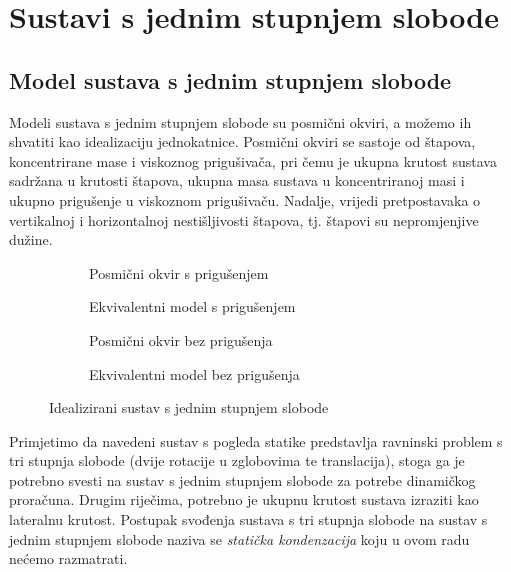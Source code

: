 \section{Sustavi s jednim stupnjem slobode}
\subsection{Model sustava s jednim stupnjem slobode}
Modeli sustava s jednim stupnjem slobode su posmični okviri, a možemo ih shvatiti
kao idealizaciju jednokatnice. Posmični okviri se sastoje od štapova, koncentrirane
mase i viskoznog prigušivača, pri čemu je ukupna krutost sustava sadržana u krutosti
štapova, ukupna masa sustava u koncentriranoj masi i ukupno prigušenje u viskoznom
prigušivaču. Nadalje, vrijedi pretpostavaka o vertikalnoj i horizontalnoj
nestišljivosti štapova, tj. štapovi su nepromjenjive dužine.
\par
\begin{figure}[H]
    \begin{subfigure}[b]{0.5\textwidth}\label{fig:priguseni-sustav-sdf}
        \centering
        
        \caption{Posmični okvir s prigušenjem}
    \end{subfigure}
    \hfill
    \begin{subfigure}[b]{0.5\textwidth}\label{fig:priguseni-ekvivalentni-sustav-sdf}
        \centering
        
        \caption{Ekvivalentni model s prigušenjem}
    \end{subfigure}
    \vfill
    \begin{subfigure}[b]{0.5\textwidth}\label{fig:nepriguseni-sustav-sdf}
        \centering
        
        \caption{Posmični okvir bez prigušenja}
    \end{subfigure}
    \hfill
    \begin{subfigure}[b]{0.5\textwidth}\label{fig:nepriguseni-ekvivalentni-sustav-sdf}
        \centering
        
        \caption{Ekvivalentni model bez prigušenja}
    \end{subfigure}
    \caption{Idealizirani sustav s jednim stupnjem slobode}
\end{figure}

Primjetimo da navedeni sustav s pogleda statike predstavlja ravninski problem s tri
stupnja slobode (dvije rotacije u zglobovima te translacija), stoga ga je potrebno
svesti na sustav s jednim stupnjem slobode za potrebe dinamičkog proračuna. Drugim
riječima, potrebno je ukupnu krutost sustava izraziti kao lateralnu krutost.
Postupak svođenja sustava s tri stupnja slobode na sustav s jednim stupnjem slobode
naziva se \textit{statička kondenzacija} koju u ovom radu nećemo razmatrati.
\newpage


